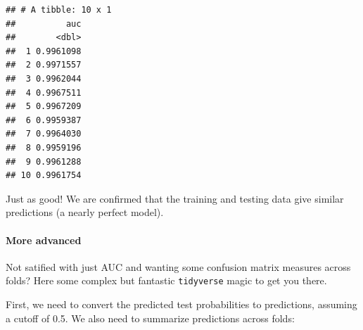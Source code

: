 \documentclass[]{article}
\newenvironment{Shaded}{\begin{snugshade}}{\end{snugshade}}
\newcommand{\KeywordTok}[1]{\textcolor[rgb]{0.13,0.29,0.53}{\textbf{#1}}}
\newcommand{\DataTypeTok}[1]{\textcolor[rgb]{0.13,0.29,0.53}{#1}}
\newcommand{\FloatTok}[1]{\textcolor[rgb]{0.00,0.00,0.81}{#1}}
\newcommand{\StringTok}[1]{\textcolor[rgb]{0.31,0.60,0.02}{#1}}
\newcommand{\OperatorTok}[1]{\textcolor[rgb]{0.81,0.36,0.00}{\textbf{#1}}}
\newcommand{\NormalTok}[1]{#1}
\let\oldparagraph\paragraph
\renewcommand{\paragraph}[1]{\oldparagraph{#1}\mbox{}}
\begin{document}
\begin{Shaded}
\end{Shaded}

\begin{verbatim}
## # A tibble: 10 x 1
##          auc
##        <dbl>
##  1 0.9961098
##  2 0.9971557
##  3 0.9962044
##  4 0.9967511
##  5 0.9967209
##  6 0.9959387
##  7 0.9964030
##  8 0.9959196
##  9 0.9961288
## 10 0.9961754
\end{verbatim}

Just as good! We are confirmed that the training and testing data give
similar predictions (a nearly perfect model).

\paragraph{More advanced}\label{more-advanced}

Not satified with just AUC and wanting some confusion matrix measures
across folds? Here some complex but fantastic \texttt{tidyverse} magic
to get you there.

First, we need to convert the predicted test probabilities to
predictions, assuming a cutoff of 0.5. We also need to summarize
predictions across folds:

\begin{Shaded}
\end{Shaded}
\end{document}
